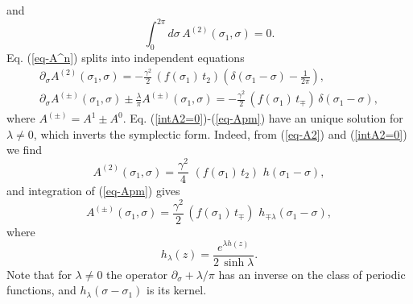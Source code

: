 \documentclass[a4paper,12pt]{article}
\begin{document}
and
\begin{equation}\label{intA2=0}
\int_0^{2\pi}d\sigma\,
 A^{(2)}(\sigma_1,\sigma) = 0.
\end{equation}
Eq. (\ref{eq-A^n}) splits into independent equations
\begin{eqnarray}\label{eq-A2}
\partial_\sigma A^{(2)}(\sigma_1,\sigma)=
-\frac{\gamma^2}{2}\, (f(\sigma_1)\,t_2)
\left(\delta(\sigma_1-\sigma)-\frac{1}{2\pi}\right),\\
\label{eq-Apm}
\partial_\sigma A^{(\pm)}(\sigma_1,\sigma) \pm
\frac{\lambda}{\pi}A^{(\pm)}(\sigma_1,\sigma)=
-\frac{\gamma^2}{2}\, (f(\sigma_1)\,t_\mp)\,
\delta (\sigma_1-\sigma),
\end{eqnarray}
where $A^{(\pm)}=A^1\pm A^0$.
Eq. (\ref{intA2=0})-(\ref{eq-Apm}) have an unique solution
for $\lambda \neq 0$, which inverts the symplectic
form. Indeed, from (\ref{eq-A2}) and (\ref{intA2=0}) we find
\begin{equation}\label{A2}
A^{(2)}(\sigma_1,\sigma)=
\frac{\gamma^2}{4}\,\, (f(\sigma_1)\,t_2)\,\,
h(\sigma_1-\sigma),
\end{equation}
and integration of (\ref{eq-Apm}) gives
\begin{equation}\label{Apm}
A^{(\pm)}(\sigma_1,\sigma)=
\frac{\gamma^2}{2}\, (f(\sigma_1)\,t_\mp)\,\,
h_{\mp\lambda} (\sigma_1-\sigma),
\end{equation}
where
\begin{equation}\label{h_lambda}
h_\lambda (z)=\frac{e^{\lambda h(z)}}{2\,\sinh\lambda}.
\end{equation}
Note that for $\lambda\neq 0$
the operator $\partial_\sigma +\lambda/\pi$ has an inverse
on the class of periodic functions, and
$h_\lambda (\sigma -\sigma_1)$ is its kernel.
\end{document}
